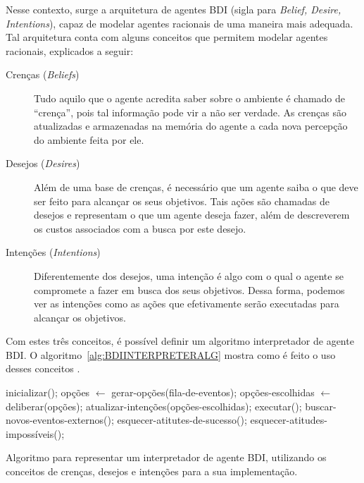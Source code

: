 Nesse contexto, surge a arquitetura de agentes BDI (sigla para \textit{Belief,
Desire, Intentions}), capaz de modelar agentes racionais de uma maneira mais
adequada. Tal arquitetura conta com alguns conceitos que permitem modelar
agentes racionais, explicados a seguir:

\begin{description}
\item [Crenças (\textit{Beliefs})]
Tudo aquilo que o agente acredita saber sobre o ambiente é chamado de
``crença'', pois tal informação pode vir a não ser verdade.  As crenças são
atualizadas e armazenadas na memória do agente a cada nova percepção do
ambiente feita por ele.

\item [Desejos (\textit{Desires})]
Além de uma base de crenças, é necessário que um agente saiba o que deve ser
feito para alcançar os seus objetivos. Tais ações são chamadas de desejos e
representam o que um agente deseja fazer, além de descreverem os custos
associados com a busca por este desejo.

\item [Intenções (\textit{Intentions})]
Diferentemente dos desejos, uma intenção é algo com o qual o agente se
compromete a fazer em busca dos seus objetivos. Dessa forma, podemos ver as
intenções como as ações que efetivamente serão executadas para alcançar os
objetivos.
\end{description}

Com estes três conceitos, é possível definir um algoritmo interpretador de
agente BDI. O algoritmo~\ref{alg:BDIINTERPRETERALG} mostra como é feito o uso
desses conceitos \cite{BDIFROMTHEORYTOPRACTICE}.

\begin{algorithm}[htb] \begin{center}
	\begin{algorithmic}[1] \STATE inicializar(); \STATE {} \STATE
	opções $\gets$ gerar-opções(fila-de-eventos); \STATE opções-escolhidas
	$\gets$ deliberar(opções); \STATE atualizar-intenções(opções-escolhidas);
	\STATE executar(); \STATE buscar-novos-eventos-externos(); \STATE
	esquecer-atitutes-de-sucesso(); \STATE esquecer-atitudes-impossíveis();
	\ENDWHILE \end{algorithmic} \end{center} \caption[Algoritmo para representar
	um interpretador de agente BDI.] {\label{alg:BDIINTERPRETERALG} Algoritmo
	para representar um interpretador de agente BDI, utilizando os conceitos de
	crenças, desejos e intenções para a sua implementação.} \end{algorithm}

